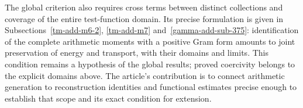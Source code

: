 The global criterion also requires cross terms between
distinct collections and coverage of the entire test-function
domain. Its precise formulation is given in
Subsections~\ref{tm-add-m6-2}, \ref{tm-add-m7}
and~\ref{gamma-add-sub-375}: identification of the complete
arithmetic moments with a positive Gram form amounts to
joint preservation of energy and transport, with their
domains and limits. This condition remains a hypothesis
of the global results; proved coercivity belongs to the
explicit domains above. The article's contribution is to
connect arithmetic generation to reconstruction identities
and functional estimates precise enough to establish
that scope and its exact condition for extension.
\clearpage
